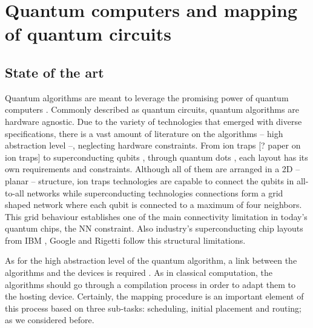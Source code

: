 
\chapter*{Quantum computers and mapping of quantum circuits}
\label{sec:orgb8ca163}
\section*{State of the art}
\label{sec:orgc210c23}

Quantum algorithms are meant to leverage the promising power of quantum computers \cite{coles18:quant_algor_implem_begin}.
Commonly described as quantum circuits, quantum algorithms are hardware agnostic.
Due to the variety of technologies that emerged with diverse specifications, there is a vast amount of literature on the algorithms -- high abstraction level --, neglecting hardware constraints.
From ion traps [? paper on ion traps] to superconducting qubits \cite{Barends_2014,Versluis_2017}, through quantum dots \cite{Hill_2015,Li_2018}, each layout has its own requirements and constraints.
Although all of them are arranged in a 2D -- planar -- structure, ion traps technologies are capable to connect the qubits in all-to-all networks while superconducting technologies connections form a grid shaped network where each qubit is connected to a maximum of four neighbors.
This grid behaviour establishes one of the main connectivity limitation in today's quantum chips, the NN constraint.
Also industry's superconducting chip layouts from IBM \cite{IBM_QX}, Google \cite{boixo16:charac_quant_suprem_near_term_devic} and Rigetti \cite{Sete_2016} follow this structural limitations.

As for the high abstraction level of the quantum algorithm, a link between the algorithms and the devices is required \cite{Fu_2016}.
As in classical computation, the algorithms should go through a compilation process in order to adapt them to the hosting device.
Certainly, the mapping procedure is an important element of this process based on three sub-tasks: scheduling, initial placement and routing; as we considered before.

